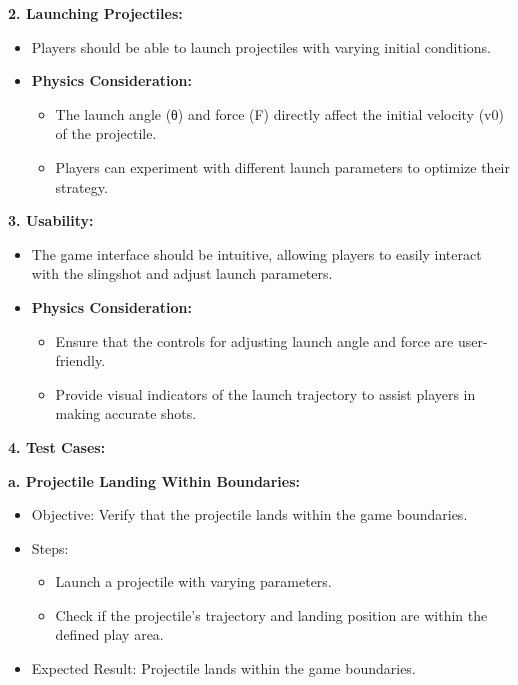 \documentclass[
]{article}
\begin{document}
\textbf{2. Launching Projectiles:}

\begin{itemize}
\item
  Players should be able to launch projectiles with varying initial
  conditions.
\item
  \textbf{Physics Consideration:}

  \begin{itemize}
  \item
    The launch angle (θ) and force (F) directly affect the initial
    velocity (v0\hspace{0pt}) of the projectile.
  \item
    Players can experiment with different launch parameters to optimize
    their strategy.
  \end{itemize}
\end{itemize}

\textbf{3. Usability:}

\begin{itemize}
\item
  The game interface should be intuitive, allowing players to easily
  interact with the slingshot and adjust launch parameters.
\item
  \textbf{Physics Consideration:}

  \begin{itemize}
  \item
    Ensure that the controls for adjusting launch angle and force are
    user-friendly.
  \item
    Provide visual indicators of the launch trajectory to assist players
    in making accurate shots.
  \end{itemize}
\end{itemize}

\textbf{4. Test Cases:}

\textbf{a. Projectile Landing Within Boundaries:}

\begin{itemize}
\item
  Objective: Verify that the projectile lands within the game
  boundaries.
\item
  Steps:

  \begin{itemize}
  \item
    Launch a projectile with varying parameters.
  \item
    Check if the projectile's trajectory and landing position are within
    the defined play area.
  \end{itemize}
\item
  Expected Result: Projectile lands within the game boundaries.
\end{itemize}
\end{document}
